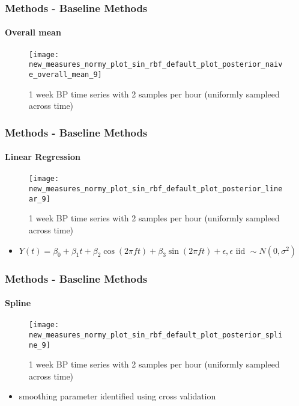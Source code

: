 \documentclass[
	8pt, %
]{beamer}
\begin{document}
\begin{frame}
	\frametitle{Methods - Baseline Methods}
	\framesubtitle{Overall mean}

		\begin{figure}
			\texttt{[image: new\_measures\_normy\_plot\_sin\_rbf\_default\_plot\_posterior\_naive\_overall\_mean\_9]}
			\caption{1 week BP time series with 2 samples per hour (uniformly sampleed across time)}
		\end{figure}

\end{frame}

%

\begin{frame}
	\frametitle{Methods - Baseline Methods}
	\framesubtitle{Linear Regression}
		\begin{figure}
			\texttt{[image: new\_measures\_normy\_plot\_sin\_rbf\_default\_plot\_posterior\_linear\_9]}
			\caption{1 week BP time series with 2 samples per hour (uniformly sampleed across time)}
		\end{figure}

	\begin{itemize}
		\item $Y(t) = \beta_0 + \beta_1 t + \beta_2 \cos(2 \pi f t) + \beta_3 \sin(2 \pi f t) + \epsilon, \epsilon \text{ iid } \sim N(0, \sigma^2)$
	\end{itemize}

\end{frame}

\begin{frame}
	\frametitle{Methods - Baseline Methods}
	\framesubtitle{Spline}
		\begin{figure}
			\texttt{[image: new\_measures\_normy\_plot\_sin\_rbf\_default\_plot\_posterior\_spline\_9]}
			\caption{1 week BP time series with 2 samples per hour (uniformly sampleed across time)}
		\end{figure}

	\begin{itemize}
		\item smoothing parameter identified using cross validation
	\end{itemize}

\end{frame}
\end{document}
